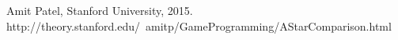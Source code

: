 \begin{thebibliography}{11}
		Amit Patel, Stanford University, 2015. http://theory.stanford.edu/~amitp/GameProgramming/AStarComparison.html
\end{thebibliography}
